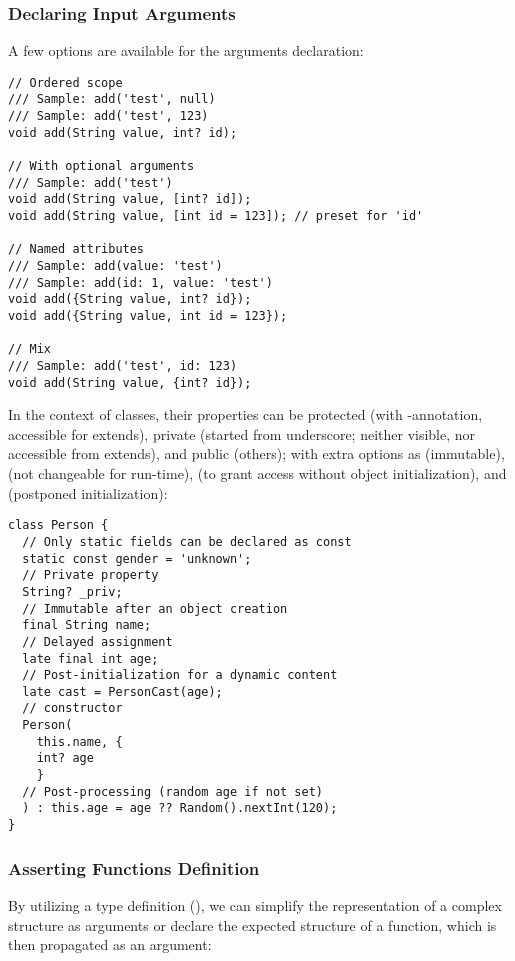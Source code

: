 \subsubsection{Declaring Input Arguments}

A few options are available for the arguments declaration:

\begin{lstlisting}
// Ordered scope
/// Sample: add('test', null)
/// Sample: add('test', 123)
void add(String value, int? id);

// With optional arguments
/// Sample: add('test')
void add(String value, [int? id]);
void add(String value, [int id = 123]); // preset for 'id'

// Named attributes
/// Sample: add(value: 'test')
/// Sample: add(id: 1, value: 'test')
void add({String value, int? id});
void add({String value, int id = 123});

// Mix
/// Sample: add('test', id: 123)
void add(String value, {int? id});
\end{lstlisting}

\noindent In the context of classes, their properties can be protected (with -annotation, accessible for
extends), private (started from underscore; neither visible, nor accessible from extends), and public (others);
with extra options as  (immutable),  (not changeable for run-time),  (to
grant access without object initialization), and  (postponed initialization):

\begin{lstlisting}
class Person {
  // Only static fields can be declared as const
  static const gender = 'unknown';
  // Private property
  String? _priv;
  // Immutable after an object creation
  final String name;
  // Delayed assignment
  late final int age;
  // Post-initialization for a dynamic content
  late cast = PersonCast(age);
  // constructor
  Person(
    this.name, {
    int? age
    }
  // Post-processing (random age if not set)
  ) : this.age = age ?? Random().nextInt(120);
}
\end{lstlisting}


\subsubsection{Asserting Functions Definition}

By utilizing a type definition (), we can simplify the representation of a complex structure as arguments or
declare the expected structure of a function, which is then propagated as an argument:

